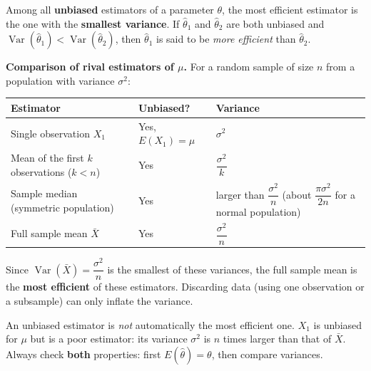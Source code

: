 \documentclass[11pt]{article}
\newcommand{\cle}[1]{{\popxbold\color{popdark}#1}}
\begin{document}
\begin{definition}
Among all \textbf{unbiased} estimators of a parameter $\theta$, the \cle{most efficient estimator} is the one with the \textbf{smallest variance}. If $\hat{\theta}_{1}$ and $\hat{\theta}_{2}$ are both unbiased and $\operatorname{Var}(\hat{\theta}_{1}) < \operatorname{Var}(\hat{\theta}_{2})$, then $\hat{\theta}_{1}$ is said to be \emph{more efficient} than $\hat{\theta}_{2}$.
\end{definition}

\textbf{Comparison of rival estimators of $\mu$.} For a random sample of size $n$ from a population with variance $\sigma^{2}$:

\begin{center}
\begin{tabularx}{\linewidth}{|l|X|X|}
\hline
\rowcolor{popblueL} \textbf{Estimator} & \textbf{Unbiased?} & \textbf{Variance} \\
\hline
Single observation $X_{1}$ & Yes, $E(X_{1})=\mu$ & $\sigma^{2}$ \\
\hline
Mean of the first $k$ observations ($k<n$) & Yes & $\dfrac{\sigma^{2}}{k}$ \\
\hline
Sample median (symmetric population) & Yes & larger than $\dfrac{\sigma^{2}}{n}$ (about $\dfrac{\pi\sigma^{2}}{2n}$ for a normal population) \\
\hline
Full sample mean $\bar{X}$ & Yes & $\dfrac{\sigma^{2}}{n}$ \\
\hline
\end{tabularx}
\end{center}

Since $\operatorname{Var}(\bar{X}) = \dfrac{\sigma^{2}}{n}$ is the smallest of these variances, the full sample mean is the \textbf{most efficient} of these estimators. Discarding data (using one observation or a subsample) can only inflate the variance.

\begin{attention}
An unbiased estimator is \emph{not} automatically the most efficient one. $X_{1}$ is unbiased for $\mu$ but is a poor estimator: its variance $\sigma^{2}$ is $n$ times larger than that of $\bar{X}$. Always check \textbf{both} properties: first $E(\hat{\theta}) = \theta$, then compare variances.
\end{attention}
\end{document}

